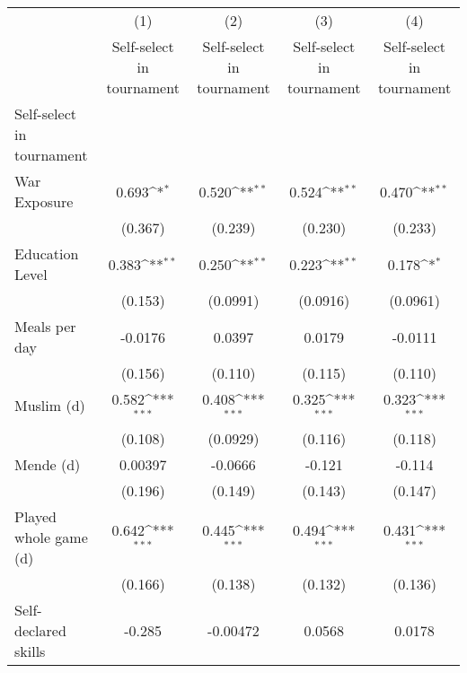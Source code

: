 {
\def\sym#1{\ifmmode^{#1}\else\(^{#1}\)\fi}
\begin{tabular}{l*{4}{c}}
\hline\hline
                    &\multicolumn{1}{c}{(1)}&\multicolumn{1}{c}{(2)}&\multicolumn{1}{c}{(3)}&\multicolumn{1}{c}{(4)}\\
                    &\multicolumn{1}{c}{Self-select in tournament}&\multicolumn{1}{c}{Self-select in tournament}&\multicolumn{1}{c}{Self-select in tournament}&\multicolumn{1}{c}{Self-select in tournament}\\
\hline
Self-select in tournament&                     &                     &                     &                     \\
War Exposure        &       0.693\sym{*}  &       0.520\sym{**} &       0.524\sym{**} &       0.470\sym{**} \\
                    &     (0.367)         &     (0.239)         &     (0.230)         &     (0.233)         \\
[1em]
Education Level     &       0.383\sym{**} &       0.250\sym{**} &       0.223\sym{**} &       0.178\sym{*}  \\
                    &     (0.153)         &    (0.0991)         &    (0.0916)         &    (0.0961)         \\
[1em]
Meals per day       &     -0.0176         &      0.0397         &      0.0179         &     -0.0111         \\
                    &     (0.156)         &     (0.110)         &     (0.115)         &     (0.110)         \\
[1em]
Muslim (d)          &       0.582\sym{***}&       0.408\sym{***}&       0.325\sym{***}&       0.323\sym{***}\\
                    &     (0.108)         &    (0.0929)         &     (0.116)         &     (0.118)         \\
[1em]
Mende (d)           &     0.00397         &     -0.0666         &      -0.121         &      -0.114         \\
                    &     (0.196)         &     (0.149)         &     (0.143)         &     (0.147)         \\
[1em]
Played whole game (d)&       0.642\sym{***}&       0.445\sym{***}&       0.494\sym{***}&       0.431\sym{***}\\
                    &     (0.166)         &     (0.138)         &     (0.132)         &     (0.136)         \\
[1em]
Self-declared skills&      -0.285         &    -0.00472         &      0.0568         &      0.0178         \\

\end{tabular}}

